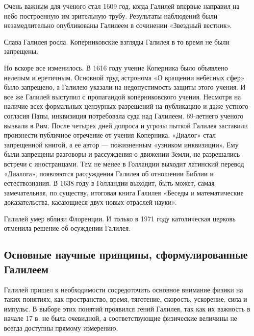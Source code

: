 \documentclass[
]{article}
\begin{document}
Очень важным для ученого стал 1609 год, когда Галилей впервые направил
на небо построенную им зрительную трубу. Результаты наблюдений были
незамедлительно опубликованы Галилеем в сочинении «Звездный вестник».

Слава Галилея росла. Коперниковские взгляды Галилея в то время не были
запрещены.

Но вскоре все изменилось. В 1616 году учение Коперника было объявлено
нелепым и еретичным. Основной труд астронома «О вращении небесных сфер»
было запрещено, а Галилею указали на недопустимость защиты этого учения.
И все же Галилей выступил с пропагандой коперниковского учения. Несмотря
на наличие всех формальных цензурных разрешений на публикацию и даже
устного согласия Папы, инквизиция потребовала суда над Галилеем.
69-летнего ученого вызвали в Рим. После четырех дней допроса и угрозы
пыткой Галилея заставили произнести публичное отречение от учения
Коперника. «Диалог» стал запрещенной книгой, а ее автор --- пожизненным
«узником инквизиции». Ему были запрещены разговоры и рассуждения о
движении Земли, не разрешались встречи с иностранцами. Тем не менее в
Голландии выходит латинский перевод «Диалога», появляются рассуждения
Галилея об отношении Библии и естествознания. В 1638 году в Голландии
выходит, быть может, самая замечательная, по существу, итоговая книга
Галилея «Беседы и математические доказательства, касающиеся двух новых
отраслей науки».

Галилей умер вблизи Флоренции. И только в 1971 году католическая церковь
отменила решение об осуждении Галилея.

\hypertarget{ux43eux441ux43dux43eux432ux43dux44bux435-ux43dux430ux443ux447ux43dux44bux435-ux43fux440ux438ux43dux446ux438ux43fux44b-ux441ux444ux43eux440ux43cux443ux43bux438ux440ux43eux432ux430ux43dux43dux44bux435-ux433ux430ux43bux438ux43bux435ux435ux43c}{%
\subsection{Основные научные принципы, сформулированные
Галилеем}\label{ux43eux441ux43dux43eux432ux43dux44bux435-ux43dux430ux443ux447ux43dux44bux435-ux43fux440ux438ux43dux446ux438ux43fux44b-ux441ux444ux43eux440ux43cux443ux43bux438ux440ux43eux432ux430ux43dux43dux44bux435-ux433ux430ux43bux438ux43bux435ux435ux43c}}

Галилей пришел к необходимости сосредоточить основное внимание физики на
таких понятиях, как пространство, время, тяготение, скорость, ускорение,
сила и импульс. В выборе этих понятий проявился гений Галилея, так как
их важность в начале 17 в. не была очевидной, а соответствующие
физические величины не всегда доступны прямому измерению.
\end{document}
